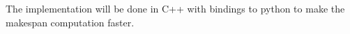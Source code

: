 The implementation will be done in C++ with bindings to python to make
the makespan computation faster.

